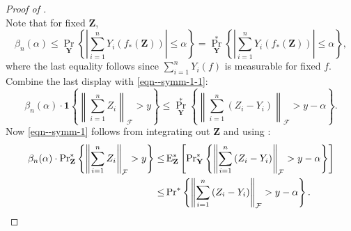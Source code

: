 \begin{proof}[Proof of ]
\begin{equation}
\end{equation}
Note that for fixed \(\mathbf{Z}\),
\begin{equation*}
  \beta_{n} (\alpha) \leq \Pr_{\mathbf{Y}} \left\{ \left| \sum_{i =
  1}^{n} Y_{i} \left( f_{\ast} (\mathbf{Z}) \right) \right| \leq \alpha \right\}
  = \Pr_{\mathbf{Y}}^{\ast} \left\{ \left| \sum_{i = 1}^{n} Y_{i} \left(
  f_{\ast} (\mathbf{Z}) \right) \right| \leq \alpha \right\},
\end{equation*}
where the last equality follows since \(\sum_{i = 1}^{n} Y_{i} (f)\) is
measurable for fixed \(f\).
Combine the last display with \eqref{eqn--symm-1-1}:
\begin{equation*}
  \beta_{n} (\alpha) \cdot \mathbf{1} \left\{ \left\| \sum_{i = 1}^{n} Z_{i}
  \right\|_{\mathcal{F}} > y \right\} \leq
  \Pr_{\mathbf{Y}}^{\ast} \left\{ \left\| \sum_{i = 1}^{n} \left( Z_{i} - Y_{i}
  \right) \right\|_{\mathcal{F}} > y - \alpha \right\}.
\end{equation*}
Now
\eqref{eqn--symm-1} follows from integrating out \(\mathbf{Z}\) and using
:
\begin{align*}
  \beta_{n} (\alpha) \cdot \mathrm{Pr}_{\mathbf{Z}}^{\ast} \left\{ \left\| \sum_{i =
  1}^{n} Z_{i} \right\|_{\mathcal{F}} > y \right\} \leq & \,
  \mathrm{E}_{\mathbf{Z}}^{\ast} \left[ \mathrm{Pr}_{\mathbf{Y}}^{\ast} \left\{ \left\| \sum_{i
  = 1}^{n} \left( Z_{i} - Y_{i} \right) \right\|_{\mathcal{F}} > y - \alpha
  \right\} \right] \\
  \leq
  & \, \mathrm{Pr}^{\ast} \left\{ \left\| \sum_{i = 1}^{n} \left( Z_{i} - Y_{i} \right)
  \right\|_{\mathcal{F}} > y - \alpha \right\}.
\end{align*}
\end{proof}



